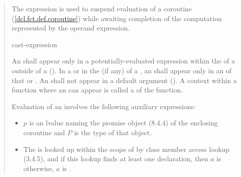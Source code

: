 \begin{quote}
\pnum
The  expression is used to suspend evaluation of a 
coroutine (\ref{dcl.fct.def.coroutine}) while awaiting completion of the computation represented by the operand expression.

\begin{bnf}
  \br
   cast-expression
\end{bnf}

\pnum
An  shall appear only in a potentially-evaluated expression within the  of a  
 outside of a  (). In a  or in the  (if any) of a , an  shall appear only in an  of that  or .
An  shall not appear in a default argument (). A context within a function where an  can appear is called a  of the function.

\pnum
Evaluation of an  involves the following auxiliary expressions:

\begin{itemize}
	
  
  \item $p$ is an lvalue naming the promise object (8.4.4) of the enclosing coroutine and $P$ is the type of that object.
  \item The   is looked up within the scope of  by class member access lookup (3.4.5), and if this lookup finds at least one declaration, then $a$ is  otherwise, $a$ is .  


\end{itemize}
\end{quote}
